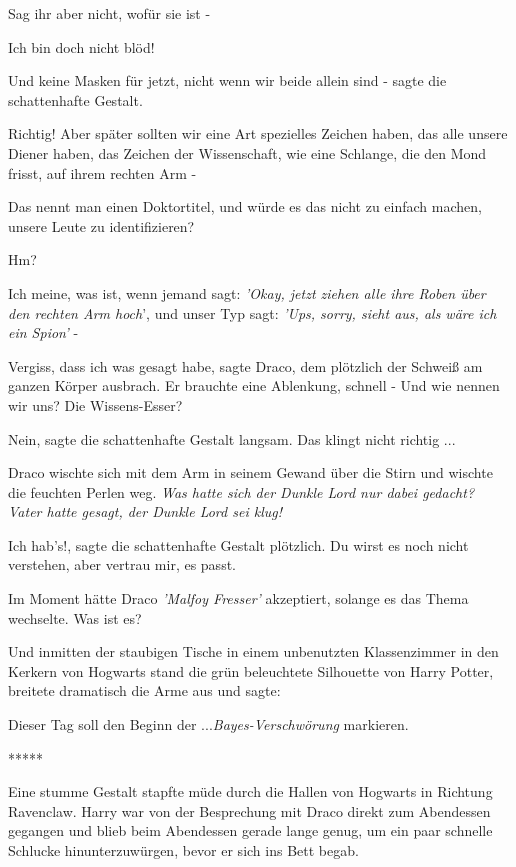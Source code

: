 \glqq{}Sag ihr aber nicht, wofür sie ist -\grqq{}

\glqq{}Ich bin doch nicht blöd!\grqq{}

\glqq{}Und keine Masken für jetzt, nicht wenn wir beide allein sind -\grqq{}
sagte die schattenhafte Gestalt.

\glqq{}Richtig! Aber später sollten wir eine Art spezielles Zeichen haben, das
alle unsere Diener haben, das Zeichen der Wissenschaft, wie eine Schlange, die
den Mond frisst, auf ihrem rechten Arm -\grqq{}

\glqq{}Das nennt man einen Doktortitel, und würde es das nicht zu einfach machen,
unsere Leute zu identifizieren?\grqq{}

\glqq{}Hm?\grqq{}

\glqq{}Ich meine, was ist, wenn jemand sagt: \emph{'Okay, jetzt ziehen alle ihre
Roben über den rechten Arm hoch}', und unser Typ sagt: \emph{'Ups, sorry, sieht
aus, als wäre ich ein Spion'} -\grqq{}

\glqq{}Vergiss, dass ich was gesagt habe\grqq{}, sagte Draco, dem plötzlich der
Schweiß am ganzen Körper ausbrach. Er brauchte eine Ablenkung, schnell - \glqq{}
Und wie nennen wir uns? Die Wissens-Esser?\grqq{}

\glqq{}Nein\grqq{}, sagte die schattenhafte Gestalt langsam. \glqq{}Das klingt
nicht richtig ...\grqq{}

Draco wischte sich mit dem Arm in seinem Gewand über die Stirn und wischte die
feuchten Perlen weg. \emph{Was hatte sich der Dunkle Lord nur dabei gedacht?
Vater hatte gesagt, der Dunkle Lord sei klug!}

\glqq{}Ich hab's!\grqq{}, sagte die schattenhafte Gestalt plötzlich. \glqq{}Du
wirst es noch nicht verstehen, aber vertrau mir, es passt.\grqq{}

Im Moment hätte Draco \emph{'Malfoy Fresser'} akzeptiert, solange es das Thema
wechselte. \glqq{}Was ist es?\grqq{}

Und inmitten der staubigen Tische in einem unbenutzten Klassenzimmer in den
Kerkern von Hogwarts stand die grün beleuchtete Silhouette von Harry Potter,
breitete dramatisch die Arme aus und sagte:

\glqq{}Dieser Tag soll den Beginn der ...\emph{Bayes-Verschwörung}
markieren.\grqq{}

\begin{center}*****\end{center}

Eine stumme Gestalt stapfte müde durch die Hallen von Hogwarts in Richtung
Ravenclaw. Harry war von der Besprechung mit Draco direkt zum Abendessen
gegangen und blieb beim Abendessen gerade lange genug, um ein paar schnelle
Schlucke hinunterzuwürgen, bevor er sich ins Bett begab.

